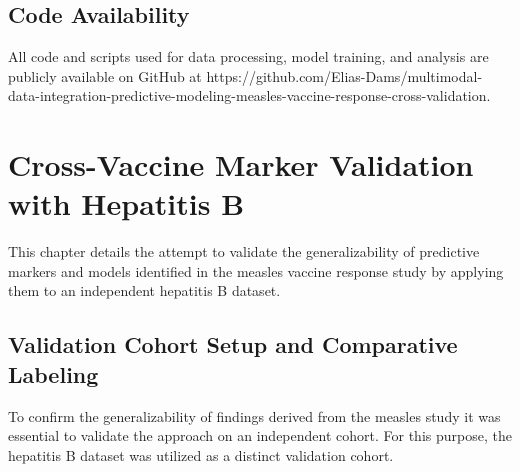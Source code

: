 \documentclass[12pt,a4paper]{report}
\newcommand{\todo}[1]{%
  \par\noindent%
  \begin{tcolorbox}[colback=yellow, colframe=black, boxrule=0.5pt, sharp corners, width=\linewidth, before skip=5pt, after skip=5pt]
    \textbf{TODO:} #1
  \end{tcolorbox}%
  \par
}
\begin{document}
\section{Code Availability}
\noindent
All code and scripts used for data processing, model training, and analysis are publicly available on GitHub at https://github.com/Elias-Dams/multimodal-data-integration-predictive-modeling-measles-vaccine-response-cross-validation.










\chapter{Cross-Vaccine Marker Validation with Hepatitis B}


\noindent
This chapter details the attempt to validate the generalizability of predictive markers and models identified in the measles vaccine response study by applying them to an independent hepatitis B dataset.

\section{Validation Cohort Setup and Comparative Labeling}
\noindent
To confirm the generalizability of findings derived from the measles study it was essential to validate the approach on an independent cohort. For this purpose, the hepatitis B dataset was utilized as a distinct validation cohort.\\
\end{document}
